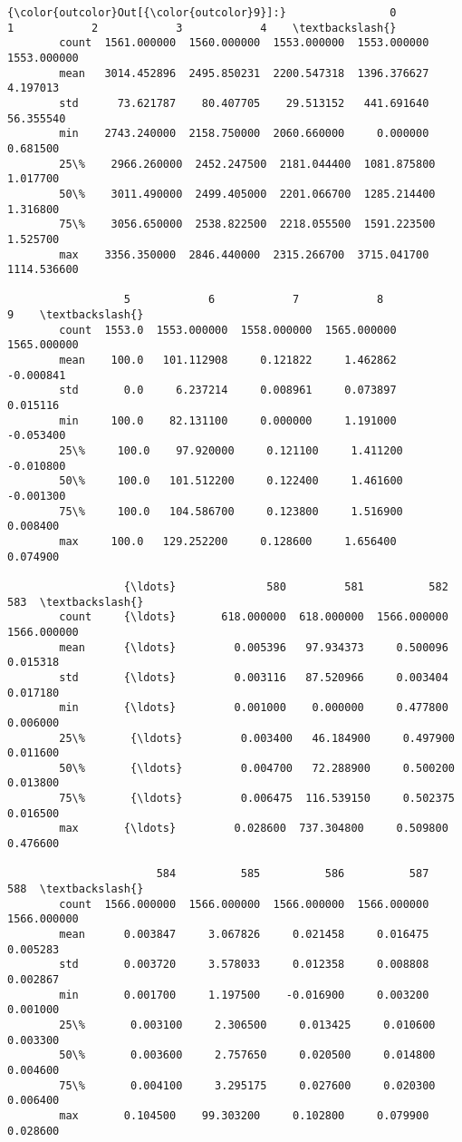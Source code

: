 \documentclass[11pt]{article}
\begin{document}
\begin{Verbatim}[commandchars=\\\{\}]
{\color{outcolor}Out[{\color{outcolor}9}]:}                0            1            2            3            4    \textbackslash{}
        count  1561.000000  1560.000000  1553.000000  1553.000000  1553.000000   
        mean   3014.452896  2495.850231  2200.547318  1396.376627     4.197013   
        std      73.621787    80.407705    29.513152   441.691640    56.355540   
        min    2743.240000  2158.750000  2060.660000     0.000000     0.681500   
        25\%    2966.260000  2452.247500  2181.044400  1081.875800     1.017700   
        50\%    3011.490000  2499.405000  2201.066700  1285.214400     1.316800   
        75\%    3056.650000  2538.822500  2218.055500  1591.223500     1.525700   
        max    3356.350000  2846.440000  2315.266700  3715.041700  1114.536600   
        
                  5            6            7            8            9    \textbackslash{}
        count  1553.0  1553.000000  1558.000000  1565.000000  1565.000000   
        mean    100.0   101.112908     0.121822     1.462862    -0.000841   
        std       0.0     6.237214     0.008961     0.073897     0.015116   
        min     100.0    82.131100     0.000000     1.191000    -0.053400   
        25\%     100.0    97.920000     0.121100     1.411200    -0.010800   
        50\%     100.0   101.512200     0.122400     1.461600    -0.001300   
        75\%     100.0   104.586700     0.123800     1.516900     0.008400   
        max     100.0   129.252200     0.128600     1.656400     0.074900   
        
                  {\ldots}              580         581          582          583  \textbackslash{}
        count     {\ldots}       618.000000  618.000000  1566.000000  1566.000000   
        mean      {\ldots}         0.005396   97.934373     0.500096     0.015318   
        std       {\ldots}         0.003116   87.520966     0.003404     0.017180   
        min       {\ldots}         0.001000    0.000000     0.477800     0.006000   
        25\%       {\ldots}         0.003400   46.184900     0.497900     0.011600   
        50\%       {\ldots}         0.004700   72.288900     0.500200     0.013800   
        75\%       {\ldots}         0.006475  116.539150     0.502375     0.016500   
        max       {\ldots}         0.028600  737.304800     0.509800     0.476600   
        
                       584          585          586          587          588  \textbackslash{}
        count  1566.000000  1566.000000  1566.000000  1566.000000  1566.000000   
        mean      0.003847     3.067826     0.021458     0.016475     0.005283   
        std       0.003720     3.578033     0.012358     0.008808     0.002867   
        min       0.001700     1.197500    -0.016900     0.003200     0.001000   
        25\%       0.003100     2.306500     0.013425     0.010600     0.003300   
        50\%       0.003600     2.757650     0.020500     0.014800     0.004600   
        75\%       0.004100     3.295175     0.027600     0.020300     0.006400   
        max       0.104500    99.303200     0.102800     0.079900     0.028600   
        

\end{Verbatim}
\end{document}
